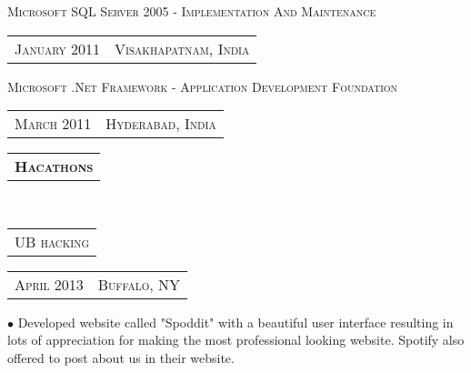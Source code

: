 \documentclass[10pt,letterpaper,oneside]{article}
\begin{document}
    \vspace{-2pt}
    \begin{adjustwidth}{7pt}{0pt}
        {\small M\textsc{icrosoft} SQL S\textsc{erver} 2005 - I\textsc{mplementation} A\textsc{nd} M\textsc{aintenance}}
        \hspace{1.69in}
        \textcolor{light-gray}{
        \begin{tabular}{c|c}
            {\small J\textsc{anuary 2011}}
            &{\small V\textsc{isakhapatnam}, I\textsc{ndia}}\\
        \end{tabular}
    }
    \end{adjustwidth}
    \vspace{-12pt}
    \begin{adjustwidth}{7pt}{0pt}
        {\small M\textsc{icrosoft} .N\textsc{et} F\textsc{ramework} - A\textsc{pplication} D\textsc{evelopment} F\textsc{oundation}}
        \hspace{1.76in}
    \textcolor{light-gray}{
        \begin{tabular}{c|c}
            {\small M\textsc{arch 2011}}
            &{\small H\textsc{yderabad}, I\textsc{ndia}}\\
        \end{tabular}
    }
    \vspace{-10pt}
    \end{adjustwidth}
    \begin{tabular}{c}
        \textbf{\normalsize H\textsc{acathons}}
    \end{tabular}\\
    \begin{tabular}{c}
        {\small UB\textsc{ hacking}}
    \end{tabular}
    \hspace{5.39in}
    \textcolor{light-gray}{
        \begin{tabular}{c|c}
            {\small A\textsc{pril 2013}}
            &{\small B\textsc{uffalo}, NY}\\
        \end{tabular}
    }
    \vspace{-12pt}
    \begin{adjustwidth}{7pt}{0pt}
        {\footnotesize  $\bullet$ Developed website called "Spoddit" with a beautiful user interface resulting in lots of appreciation for making the most professional looking website. Spotify also  offered to post about us in their website.}\\
    \end{adjustwidth}
\end{document}
